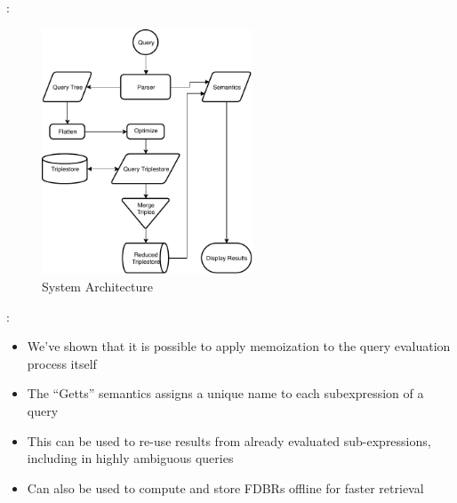\documentclass[logoontitle,tabu,supertabular,aspectratio=43]{preney-uwindsor-beamer}
\begin{document}
    \begin{frame}{\insertsection: \insertsubsection}
        \begin{figure}[h]
            \centering
            \label{fig1}
            \includegraphics[height=7.3cm]{../images/queryprocess.pdf}
            \caption{System Architecture}
        \end{figure}
    \end{frame}

    \begin{frame}{\insertsection: \insertsubsection}
        \begin{itemize}
            \item We've shown that it is possible to apply memoization to the query evaluation process itself
            \item The ``Getts'' semantics assigns a unique name to each subexpression of a query
            \item This can be used to re-use results from already evaluated sub-expressions, including in highly ambiguous queries
            \item Can also be used to compute and store FDBRs offline for faster retrieval
        \end{itemize}
    \end{frame}
\end{document}
